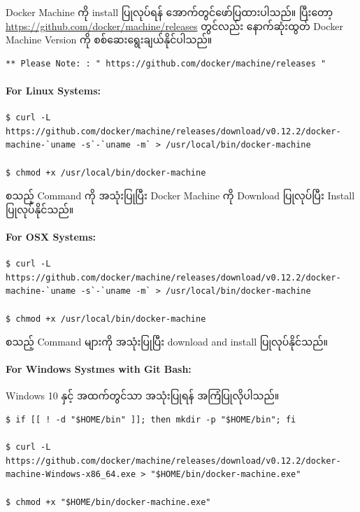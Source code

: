 Docker Machine ကို install ပြုလုပ်ရန် အောက်တွင်ဖော်ပြထားပါသည်။ ပြီးတော့
\url{https://github.com/docker/machine/releases} တွင်လည်း နောက်ဆုံးထွတ်
Docker Machine Version ကို စစ်ဆေးရွေးချယ်နိုင်ပါသည်။

\begin{verbatim}
** Please Note: : " https://github.com/docker/machine/releases " 
\end{verbatim}

\hypertarget{for-linux-systems-1}{%
\paragraph{For Linux Systems:}\label{for-linux-systems-1}}

\begin{verbatim}
$ curl -L https://github.com/docker/machine/releases/download/v0.12.2/docker-machine-`uname -s`-`uname -m` > /usr/local/bin/docker-machine

$ chmod +x /usr/local/bin/docker-machine
\end{verbatim}

စသည့် Command ကို အသုံးပြုပြီး Docker Machine ကို Download ပြုလုပ်ပြီး
Install ပြုလုပ်နိုင်သည်။

\hypertarget{for-osx-systems-1}{%
\paragraph{For OSX Systems:}\label{for-osx-systems-1}}

\begin{verbatim}
$ curl -L https://github.com/docker/machine/releases/download/v0.12.2/docker-machine-`uname -s`-`uname -m` > /usr/local/bin/docker-machine

$ chmod +x /usr/local/bin/docker-machine
\end{verbatim}

စသည့် Command များကို အသုံးပြုပြီး download and install ပြုလုပ်နိုင်သည်။

\hypertarget{for-windows-systmes-with-git-bash-1}{%
\paragraph{For Windows Systmes with Git
Bash:}\label{for-windows-systmes-with-git-bash-1}}

Windows 10 နှင့် အထက်တွင်သာ အသုံးပြုရန် အကြံပြုလိုပါသည်။

\begin{verbatim}
$ if [[ ! -d "$HOME/bin" ]]; then mkdir -p "$HOME/bin"; fi

$ curl -L https://github.com/docker/machine/releases/download/v0.12.2/docker-machine-Windows-x86_64.exe > "$HOME/bin/docker-machine.exe"

$ chmod +x "$HOME/bin/docker-machine.exe"
\end{verbatim}

